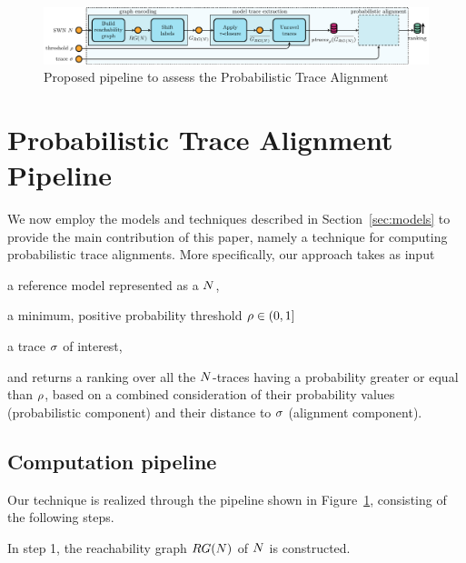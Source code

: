\begin{figure}[!t]
	\hspace*{-1cm}\includegraphics[width=1.2\textwidth]{images/pipeline}
	\caption{Proposed pipeline to assess the Probabilistic Trace Alignment}\label{fig:pipe}
\end{figure}


\section{Probabilistic Trace Alignment Pipeline}
We now employ the models and techniques described in Section~\ref{sec:models} to provide the main contribution of this paper, namely a technique for computing probabilistic trace alignments. More specifically, our approach takes as input 
\begin{inparaenum}[\it (i)]
\item a reference model represented as a \uswn $N$,
\item a minimum, positive probability threshold $\rho \in (0,1]$
\item a trace $\sigma$ of interest,  
\end{inparaenum}
and returns a ranking over all the $N$-traces having a probability greater or equal than $\rho$, based on a combined consideration of their probability values (probabilistic component) and their distance to $\sigma$ (alignment component).

\subsection{Computation pipeline}
Our technique is realized through the pipeline shown in Figure~\ref{fig:pipe}, consisting of the following steps.

In step 1, the reachability graph $RG(N)$ of $N$ is constructed.

